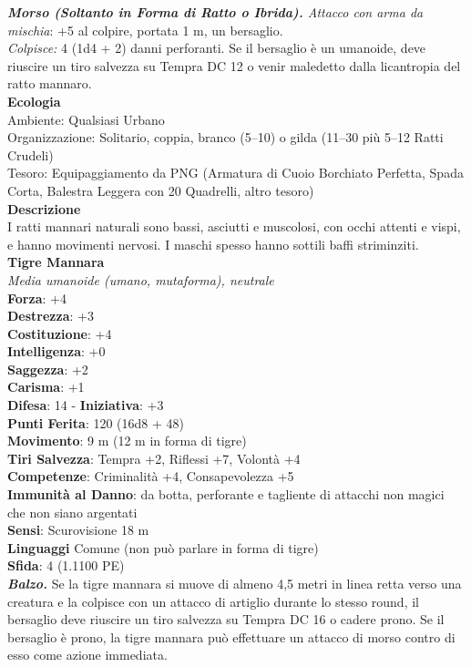 \begin{multicols}{2}
\emph{\textbf{Morso (Soltanto in Forma di Ratto o Ibrida).} Attacco con arma da mischia}: +5 al colpire, portata 1 m, un bersaglio.\\

\emph{Colpisce:} 4 (1d4 + 2) danni perforanti. Se il bersaglio è un umanoide, deve riuscire un tiro salvezza su Tempra DC  12 o venir maledetto dalla licantropia del ratto mannaro.\\
\textbf{Ecologia}\\
Ambiente: Qualsiasi Urbano\\
Organizzazione: Solitario, coppia, branco (5–10) o gilda (11–30 più 5–12 Ratti Crudeli)\\
Tesoro: Equipaggiamento da PNG (Armatura di Cuoio Borchiato Perfetta, Spada Corta, Balestra Leggera con 20 Quadrelli, altro tesoro)\\
\textbf{Descrizione}\\
I ratti mannari naturali sono bassi, asciutti e muscolosi, con occhi attenti e vispi, e hanno movimenti nervosi. I maschi spesso hanno sottili baffi striminziti.\\

\medskip\textbf{Tigre Mannara}\\
\emph{Media umanoide (umano, mutaforma), neutrale}\\
\textbf{Forza}: +4\\
\textbf{Destrezza}: +3\\
\textbf{Costituzione}: +4\\
\textbf{Intelligenza}: +0\\
\textbf{Saggezza}: +2\\
\textbf{Carisma}: +1\\
\textbf{Difesa}: 14 - \textbf{Iniziativa}: +3\\
\textbf{Punti Ferita}: 120 (16d8 + 48)\\
\textbf{Movimento}: 9 m (12 m in forma di tigre)\\
\textbf{Tiri Salvezza}: Tempra +2, Riflessi +7, Volontà +4\\
\textbf{Competenze}: Criminalità +4, Consapevolezza +5\\
\textbf{Immunità al Danno}: da botta, perforante e tagliente di attacchi non magici che non siano argentati\\
\textbf{Sensi}: Scurovisione 18 m\\
\textbf{Linguaggi} Comune (non può parlare in forma di tigre)\\
\textbf{Sfida}: 4 (1.1100 PE)\smallskip\\
\emph{\textbf{Balzo.}} Se la tigre mannara si muove di almeno 4,5 metri in linea retta verso una creatura e la colpisce con un attacco di artiglio durante lo stesso round, il bersaglio deve riuscire un tiro salvezza su Tempra DC  16 o cadere prono. Se il bersaglio è prono, la tigre mannara può effettuare un attacco di morso contro di esso come azione immediata.\\


\end{multicols}
